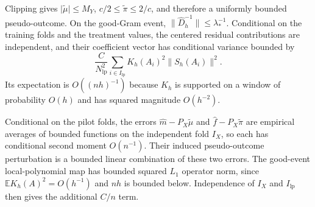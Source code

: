 Clipping gives \(\lvert\widetilde\mu\rvert\le M_Y\), \(c/2\le\widetilde\pi\le2/c\), and therefore a uniformly bounded pseudo-outcome. On the good-Gram event, \(\lVert\widehat D_h^{-1}\rVert\le\lambda_*^{-1}\). Conditional on the training folds and the treatment values, the centered residual contributions are independent, and their coefficient vector has conditional variance bounded by
\[
\frac{C}{N_{\mathrm{lp}}^2}\sum_{i\in I_{\mathrm{lp}}}K_h(A_i)^2\lVert S_h(A_i)\rVert^2.
\]
Its expectation is \(O((nh)^{-1})\) because \(K_h\) is supported on a window of probability \(O(h)\) and has squared magnitude \(O(h^{-2})\).

Conditional on the pilot folds, the errors \(\widehat m-P_X\widetilde\mu\) and \(\widehat f-P_X\widetilde\pi\) are empirical averages of bounded functions on the independent fold \(I_X\), so each has conditional second moment \(O(n^{-1})\). Their induced pseudo-outcome perturbation is a bounded linear combination of these two errors. The good-event local-polynomial map has bounded squared \(L_1\) operator norm, since \(\mathbb E K_h(A)^2=O(h^{-1})\) and \(nh\) is bounded below. Independence of \(I_X\) and \(I_{\mathrm{lp}}\) then gives the additional \(C/n\) term.